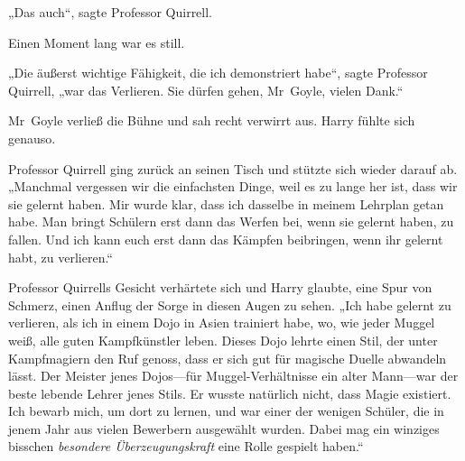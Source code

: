 „Das auch“, sagte Professor Quirrell.

Einen Moment lang war es still.

„Die äußerst wichtige Fähigkeit, die ich demonstriert habe“, sagte Professor Quirrell, „war das Verlieren. Sie dürfen gehen, Mr~Goyle, vielen Dank.“

Mr~Goyle verließ die Bühne und sah recht verwirrt aus. Harry fühlte sich genauso.

Professor Quirrell ging zurück an seinen Tisch und stützte sich wieder darauf ab. „Manchmal vergessen wir die einfachsten Dinge, weil es zu lange her ist, dass wir sie gelernt haben. Mir wurde klar, dass ich dasselbe in meinem Lehrplan getan habe. Man bringt Schülern erst dann das Werfen bei, wenn sie gelernt haben, zu fallen. Und ich kann euch erst dann das Kämpfen beibringen, wenn ihr gelernt habt, zu verlieren.“

Professor Quirrells Gesicht verhärtete sich und Harry glaubte, eine Spur von Schmerz, einen Anflug der Sorge in diesen Augen zu sehen. „Ich habe gelernt zu verlieren, als ich in einem Dojo in Asien trainiert habe, wo, wie jeder Muggel weiß, alle guten Kampfkünstler leben. Dieses Dojo lehrte einen Stil, der unter Kampfmagiern den Ruf genoss, dass er sich gut für magische Duelle abwandeln lässt. Der Meister jenes Dojos—für Muggel-Verhältnisse ein alter Mann—war der beste lebende Lehrer jenes Stils. Er wusste natürlich nicht, dass Magie existiert. Ich bewarb mich, um dort zu lernen, und war einer der wenigen Schüler, die in jenem Jahr aus vielen Bewerbern ausgewählt wurden. Dabei mag ein winziges bisschen \emph{besondere Überzeugungskraft} eine Rolle gespielt haben.“

